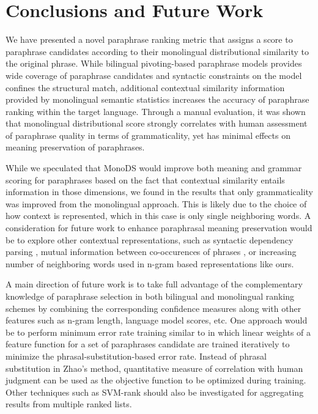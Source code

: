 \documentclass[11pt]{article}
\begin{document}
{{%
\section{Conclusions and Future Work}
We have presented a novel paraphrase ranking metric that assigns a score to paraphrase candidates according to their monolingual distributional similarity to the original phrase. While bilingual pivoting-based paraphrase models provides wide coverage of paraphrase candidates and syntactic constraints on the model confines the structural match, additional contextual similarity information provided by monolingual semantic statistics increases the accuracy of paraphrase ranking within the target language. %
Through a manual evaluation, it was shown that monolingual distributional score strongly correlates with human assessment of paraphrase quality in terms of grammaticality, yet has minimal effects on meaning preservation of paraphrases.

While we speculated that MonoDS would improve both meaning and grammar scoring
for paraphrases based on the fact that contextual similarity entails information
in those dimensions, we found in the results that only grammaticality was
improved from the monolingual approach. This is likely due to the choice of how
context is represented, which in this case is only single neighboring words. A
consideration for future work to enhance paraphrasal meaning preservation would
be to explore other contextual representations, such as syntactic dependency
parsing \cite{LinACL97}, mutual information between co-occurences of phrases
, or increasing number of neighboring words used in
n-gram based representations like ours.

A main direction of future work is to take full advantage of the complementary knowledge of paraphrase selection in both bilingual and monolingual ranking schemes by combining the corresponding confidence measures along with other features such as n-gram length, language model scores, etc. One approach would be to perform minimum error rate training similar to  in which linear weights of a feature function for a set of paraphrases candidate are trained iteratively to minimize the phrasal-substitution-based error rate. Instead of phrasal substitution in Zhao's method, quantitative measure of correlation with human judgment can be used as the objective function to be optimized during training. Other techniques such as SVM-rank \cite{Joachims02} should also be investigated for aggregating results from multiple ranked lists. 

}}
\end{document}
